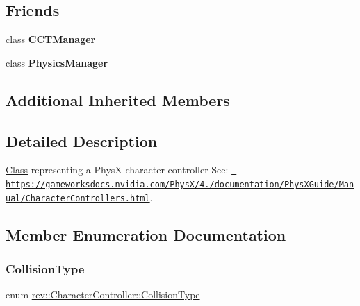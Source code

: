 \subsection*{Friends}
\begin{DoxyCompactItemize}
\item 
\mbox{\label{classrev_1_1_character_controller_aed3d0fdf6b78428902946828649415c9}} 
class {\bfseries C\+C\+T\+Manager}
\item 
\mbox{\label{classrev_1_1_character_controller_a139cf05ac01161b7071c8a037c841683}} 
class {\bfseries Physics\+Manager}
\end{DoxyCompactItemize}
\subsection*{Additional Inherited Members}


\subsection{Detailed Description}
\mbox{\hyperlink{struct_class}{Class}} representing a PhysX character controller See\+: \href{https://gameworksdocs.nvidia.com/PhysX/4.0/documentation/PhysXGuide/Manual/CharacterControllers.html}{\texttt{ https\+://gameworksdocs.\+nvidia.\+com/\+Phys\+X/4./documentation/\+Phys\+X\+Guide/\+Manual/\+Character\+Controllers.\+html}}. 

\subsection{Member Enumeration Documentation}
\mbox{\label{classrev_1_1_character_controller_ac4d525bc4df0feaaef505f1756ca7b11}} 
\subsubsection{\texorpdfstring{CollisionType}{CollisionType}}
{\footnotesize\ttfamily enum \mbox{\hyperlink{classrev_1_1_character_controller_ac4d525bc4df0feaaef505f1756ca7b11}{rev\+::\+Character\+Controller\+::\+Collision\+Type}}}

